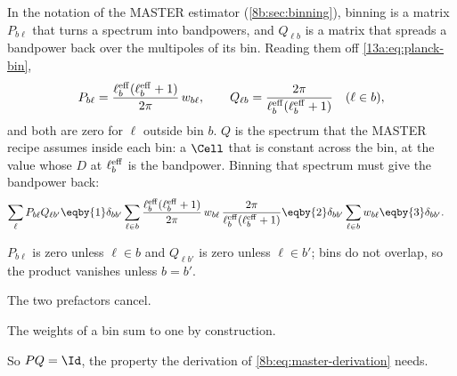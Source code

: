 In the notation of the MASTER estimator (\cref{8b:sec:binning}), binning is a matrix $P_{b\ell}$ that turns a
spectrum into bandpowers, and $Q_{\ell b}$ is a matrix that spreads a bandpower back over the multipoles of its
bin. Reading them off \eqref{13a:eq:planck-bin},
\begin{equation}
  P_{b\ell}=\frac{\ell_b^{\rm eff}(\ell_b^{\rm eff}+1)}{2\pi}\,w_{b\ell},\qquad
  Q_{\ell b}=\frac{2\pi}{\ell_b^{\rm eff}(\ell_b^{\rm eff}+1)}\quad(\ell\in b),
  \label{13a:eq:PQ}
\end{equation}
and both are zero for $\ell$ outside bin $b$. $Q$ is the spectrum that the MASTER recipe assumes inside each bin: a
$\Cell$ that is constant across the bin, at the value whose $D$ at $\ell_b^{\rm eff}$ is the bandpower. Binning that
spectrum must give the bandpower back:
\begin{align}
  \sum_\ell P_{b\ell}Q_{\ell b'}
  &\eqby{1}\delta_{bb'}\sum_{\ell\in b}\frac{\ell_b^{\rm eff}(\ell_b^{\rm eff}+1)}{2\pi}\,w_{b\ell}\,
     \frac{2\pi}{\ell_b^{\rm eff}(\ell_b^{\rm eff}+1)}
   \eqby{2}\delta_{bb'}\sum_{\ell\in b}w_{b\ell}
   \eqby{3}\delta_{bb'} .
\end{align}
\begin{explain}
  \item $P_{b\ell}$ is zero unless $\ell\in b$ and $Q_{\ell b'}$ is zero unless $\ell\in b'$; bins do not overlap,
        so the product vanishes unless $b=b'$.
  \item The two prefactors cancel.
  \item The weights of a bin sum to one by construction.
\end{explain}
So $PQ=\Id$, the property the derivation of \eqref{8b:eq:master-derivation} needs.

